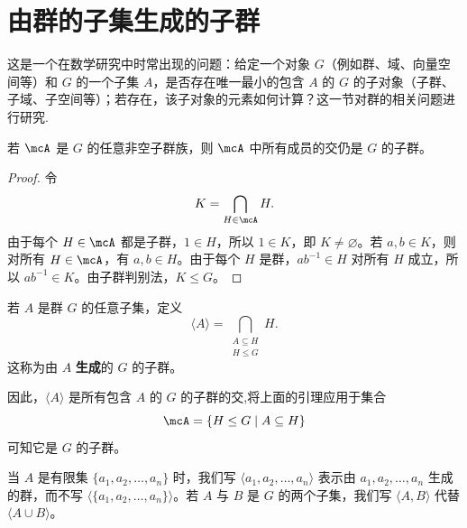 \section{由群的子集生成的子群}

这是一个在数学研究中时常出现的问题：给定一个对象 $G$（例如群、域、向量空间等）和 $G$ 的一个子集 $A$，是否存在唯一最小的包含 $A$ 的 $G$ 的子对象（子群、子域、子空间等）；若存在，该子对象的元素如何计算？这一节对群的相关问题进行研究.

 \begin{lemma}
 	若 $\mcA$ 是 $G$ 的任意非空子群族，则 $\mcA$ 中所有成员的交仍是 $G$ 的子群。

 \end{lemma}
\begin{proof}
令
	\[
	K=\bigcap_{H\in\mcA}H.
	\]
	由于每个 $H\in\mcA$ 都是子群，$1\in H$，所以 $1\in K$，即 $K\neq\varnothing$。若 $a,b\in K$，则对所有 $H\in\mcA$，有 $a,b\in H$。由于每个 $H$ 是群，$ab^{-1}\in H$ 对所有 $H$ 成立，所以 $ab^{-1}\in K$。由子群判别法，$K\leq G$。
\end{proof}
\begin{definition}
	 若 $A$ 是群 $G$ 的任意子集，定义
	\[
	\langle A\rangle=\bigcap_{\substack{A\subseteq H\\ H\leq G}}H.
	\]
	这称为由 $A$ \textbf{生成}的 $G$ 的子群。
\end{definition}

因此，$\langle A\rangle$ 是所有包含 $A$ 的 $G$ 的子群的交,将上面的引理应用于集合
\[
\mcA=\{H\leq G\mid A\subseteq H\}
\]
可知它是 $G$ 的子群。

当 $A$ 是有限集 $\{a_1,a_2,\ldots,a_n\}$ 时，我们写 $\langle a_1,a_2,\ldots,a_n\rangle$ 表示由 $a_1,a_2,\ldots,a_n$ 生成的群，而不写 $\langle\{a_1,a_2,\ldots,a_n\}\rangle$。若 $A$ 与 $B$ 是 $G$ 的两个子集，我们写 $\langle A,B\rangle$ 代替 $\langle A\cup B\rangle$。

